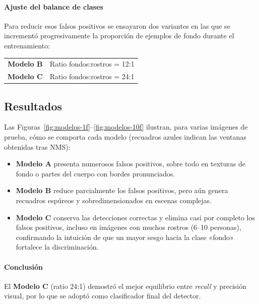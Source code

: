\documentclass{article}
\begin{document}
\paragraph{Ajuste del balance de clases}
Para reducir esos falsos positivos se ensayaron dos variantes en las que se
incrementó progresivamente la proporción de ejemplos de fondo durante el
entrenamiento:

\begin{center}
\begin{tabular}{ll}
\textbf{Modelo B} & Ratio fondos:rostros = 12:1 \\[2pt]
\textbf{Modelo C} & Ratio fondos:rostros = 24:1
\end{tabular}
\end{center}

\subsection*{Resultados}
Las Figuras~\ref{fig:modelos-1f}–\ref{fig:modelos-10f} ilustran, para varias
imágenes de prueba, cómo se comporta cada modelo (recuadros azules indican las
ventanas obtenidas tras NMS):

\begin{itemize}
    \item \textbf{Modelo A} presenta numerosos falsos positivos, sobre todo en
          texturas de fondo o partes del cuerpo con bordes pronunciados.
    \item \textbf{Modelo B} reduce parcialmente los falsos positivos, pero aún
          genera recuadros espúreos y sobredimensionados en escenas complejas.
    \item \textbf{Modelo C} conserva las detecciones correctas y elimina casi
          por completo los falsos positivos, incluso en imágenes con muchos
          rostros (6–10 personas), confirmando la intuición de que un mayor
          sesgo hacia la clase «fondo» fortalece la discriminación.
\end{itemize}

\paragraph{Conclusión} 
El \textbf{Modelo C} (ratio 24:1) demostró el mejor equilibrio entre
\emph{recall} y precisión visual, por lo que se adoptó como clasificador final
del detector.
\end{document}
